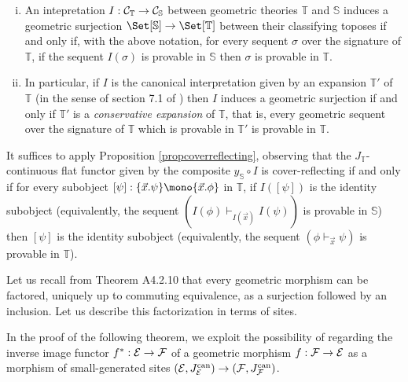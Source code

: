 \documentclass[a4paper,12pt]{article}
\begin{document}
\begin{corollary}\label{corinterpretationsfaithful}
\begin{enumerate}[(i)]
	\item An intepretation $I:{\cal C}_{\mathbb T}\to {\cal C}_{\mathbb S}$ between geometric theories $\mathbb T$ and $\mathbb S$ induces a geometric surjection $\Set[{\mathbb S}]\to \Set[{\mathbb T}]$ between their classifying toposes if and only if, with the above notation, for every sequent $\sigma$ over the signature of $\mathbb T$, if the sequent $I(\sigma)$ is provable in $\mathbb S$ then $\sigma$ is provable in $\mathbb T$. 
	
	\item In particular, if $I$ is the canonical interpretation given by an expansion ${\mathbb T}'$ of ${\mathbb T}$ (in the sense of section 7.1 of \cite{OCBook}) then $I$ induces a geometric surjection if and only if ${\mathbb T}'$ is a \emph{conservative expansion} of $\mathbb T$, that is, every geometric sequent over the signature of $\mathbb T$ which is provable in ${\mathbb T}'$ is provable in ${\mathbb T}$.
\end{enumerate}
\end{corollary}

\begin{proofs}
It suffices to apply Proposition \ref{propcoverreflecting}, observing that the $J_{\mathbb T}$-continuous flat functor given by the composite $y_{\mathbb S}\circ I$ is cover-reflecting if and only if for every subobject $[\psi]:\{\vec{x}. \psi\} \mono \{\vec{x}. \phi \}$ in ${\mathbb T}$, if $I([\psi])$ is the identity subobject (equivalently, the sequent $(I(\phi) \vdash_{I(\vec{x})} I(\psi))$ is provable in $\mathbb S$) then $[\psi]$ is the identity subobject (equivalently, the sequent $(\phi \vdash_{\vec{x}} \psi)$ is provable in $\mathbb T$). 	
\end{proofs}

Let us recall from Theorem A4.2.10 \cite{El} that every geometric morphism can be factored, uniquely up to commuting equivalence, as a surjection followed by an inclusion. Let us describe this factorization in terms of sites.

In the proof of the following theorem, we exploit the possibility of regarding the inverse image functor $f^{\ast}:{\cal E}\to {\cal F}$ of a geometric morphism $f:{\cal F}\to {\cal E}$ as a morphism of small-generated sites $({\cal E}, J_{\cal E}^{\textup{can}})\to ({\cal F}, J_{\cal F}^{\textup{can}})$.
\end{document}
